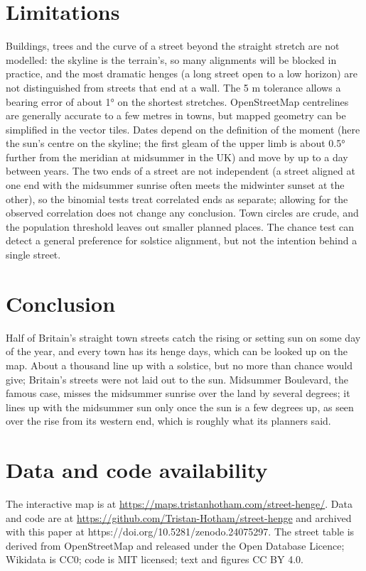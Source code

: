 \documentclass[11pt,a4paper]{article}
\begin{document}
\section{Limitations}
Buildings, trees and the curve of a street beyond the straight stretch are not modelled: the skyline is the terrain's, so many alignments will be blocked in practice, and the most dramatic henges (a long street open to a low horizon) are not distinguished from streets that end at a wall. The 5 m tolerance allows a bearing error of about 1° on the shortest stretches. OpenStreetMap centrelines are generally accurate to a few metres in towns, but mapped geometry can be simplified in the vector tiles. Dates depend on the definition of the moment (here the sun's centre on the skyline; the first gleam of the upper limb is about 0.5° further from the meridian at midsummer in the UK) and move by up to a day between years. The two ends of a street are not independent (a street aligned at one end with the midsummer sunrise often meets the midwinter sunset at the other), so the binomial tests treat correlated ends as separate; allowing for the observed correlation does not change any conclusion. Town circles are crude, and the population threshold leaves out smaller planned places. The chance test can detect a general preference for solstice alignment, but not the intention behind a single street.

\section{Conclusion}
Half of Britain's straight town streets catch the rising or setting sun on some day of the year, and every town has its henge days, which can be looked up on the map. About a thousand line up with a solstice, but no more than chance would give; Britain's streets were not laid out to the sun. Midsummer Boulevard, the famous case, misses the midsummer sunrise over the land by several degrees; it lines up with the midsummer sun only once the sun is a few degrees up, as seen over the rise from its western end, which is roughly what its planners said.

\section*{Data and code availability}
The interactive map is at \url{https://maps.tristanhotham.com/street-henge/}. Data and code are at \url{https://github.com/Tristan-Hotham/street-henge} and archived with this paper at https://doi.org/10.5281/zenodo.24075297. The street table is derived from OpenStreetMap and released under the Open Database Licence; Wikidata is CC0; code is MIT licensed; text and figures CC BY 4.0.
\end{document}
